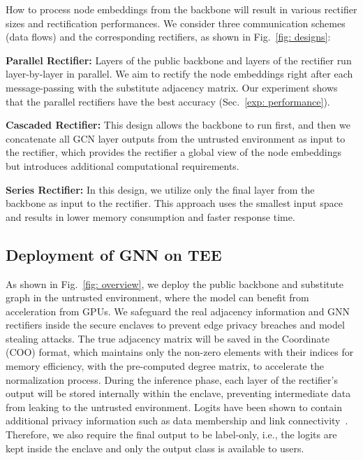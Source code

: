 How to process node embeddings from the backbone will result in various rectifier sizes and rectification performances. We consider three communication schemes (data flows) and the corresponding rectifiers, as shown in 
Fig.~\ref{fig: designs}:

\noindent\textbf{Parallel Rectifier:} Layers of the public backbone and layers of the rectifier run layer-by-layer in parallel. We aim to rectify the node embeddings right after each message-passing with the substitute adjacency matrix. Our experiment shows that the parallel rectifiers have the best accuracy (Sec.~\ref{exp: performance}). 

\noindent\textbf{Cascaded Rectifier:} This design allows the backbone to run first, and then we concatenate all GCN layer outputs from the untrusted environment as input to the rectifier, which provides the rectifier a global view of the node embeddings but introduces additional computational requirements.

\noindent\textbf{Series Rectifier:} In this design, we utilize only the final layer from the backbone as input to the rectifier. This approach uses the smallest input space and results in lower memory consumption and faster response time.

\subsection{Deployment of GNN on TEE} \label{method: deployment}
As shown in Fig.~\ref{fig: overview}, we deploy the public backbone and substitute graph in the untrusted environment, where the model can benefit from acceleration from GPUs.
We safeguard the real adjacency information and GNN rectifiers inside the secure enclaves to prevent edge privacy breaches and model stealing attacks.
The true adjacency matrix will be saved in the Coordinate (COO) format, which maintains only the non-zero elements with their indices for memory efficiency, with the pre-computed degree matrix, to accelerate the normalization process.
During the inference phase, each layer of the rectifier's output will be stored internally within the enclave, preventing intermediate data from leaking to the untrusted environment.
Logits have been shown to contain additional privacy information such as data membership and link connectivity~\cite{he2021stealing, shokri2017membership}.
Therefore, we also require the final output to be label-only, i.e., the logits are kept inside the enclave and only the output class is available to users.
